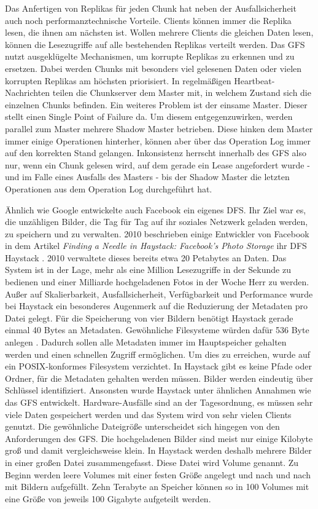 \documentclass[12pt,oneside,a4paper,parskip]{scrbook}
\begin{document}
Das Anfertigen von Replikas für jeden Chunk hat neben der Ausfallsicherheit auch noch performanztechnische Vorteile. Clients können immer die Replika lesen, die ihnen am nächsten ist. Wollen mehrere Clients die gleichen Daten lesen, können die Lesezugriffe auf alle bestehenden Replikas verteilt werden. Das GFS nutzt ausgeklügelte Mechanismen, um korrupte Replikas zu erkennen und zu ersetzen. Dabei werden Chunks mit besonders viel gelesenen Daten oder vielen korrupten Replikas am höchsten priorisiert. In regelmäßigen Heartbeat-Nachrichten teilen die Chunkserver dem Master mit, in welchem Zustand sich die einzelnen Chunks befinden. Ein weiteres Problem ist der einsame Master. Dieser stellt einen Single Point of Failure da. Um diesem entgegenzuwirken, werden parallel zum Master mehrere Shadow Master betrieben. Diese hinken dem Master immer einige Operationen hinterher, können aber über das Operation Log immer auf den korrekten Stand gelangen. Inkonsistenz herrscht innerhalb des GFS also nur, wenn ein Chunk gelesen wird, auf dem gerade ein Lease angefordert wurde - und im Falle eines Ausfalls des Masters - bis der Shadow Master die letzten Operationen aus dem Operation Log durchgeführt hat.

Ähnlich wie Google entwickelte auch Facebook ein eigenes DFS. Ihr Ziel war es, die unzähligen Bilder, die Tag für Tag auf ihr soziales Netzwerk geladen werden, zu speichern und zu verwalten. 2010 beschrieben einige Entwickler von Facebook in dem Artikel \textit{Finding a Needle in Haystack: Facebook's Photo Storage} ihr DFS Haystack \cite{haystack}. 2010 verwaltete dieses bereits etwa 20 Petabytes an Daten. Das System ist in der Lage, mehr als eine Million Lesezugriffe in der Sekunde zu bedienen und einer Milliarde hochgeladenen Fotos in der Woche Herr zu werden. Außer auf Skalierbarkeit, Ausfallsicherheit, Verfügbarkeit und Performance wurde bei Haystack ein besonderes Augenmerk auf die Reduzierung der Metadaten pro Datei gelegt. Für die Speicherung von vier Bildern benötigt Haystack gerade einmal 40 Bytes an Metadaten. Gewöhnliche Filesysteme würden dafür 536 Byte anlegen \cite{haystack}. Dadurch sollen alle Metadaten immer im Hauptspeicher gehalten werden und einen schnellen Zugriff ermöglichen. Um dies zu erreichen, wurde auf ein POSIX-konformes Filesystem verzichtet. In Haystack gibt es keine Pfade oder Ordner, für die Metadaten gehalten werden müssen. Bilder werden eindeutig über Schlüssel identifiziert. Ansonsten wurde Haystack unter ähnlichen Annahmen wie das GFS entwickelt. Hardware-Ausfälle sind an der Tagesordnung, es müssen sehr viele Daten gespeichert werden und das System wird von sehr vielen Clients genutzt. Die gewöhnliche Dateigröße unterscheidet sich hingegen von den Anforderungen des GFS. Die hochgeladenen Bilder sind meist nur einige Kilobyte groß und damit vergleichsweise klein. In Haystack werden deshalb mehrere Bilder in einer großen Datei zusammengefasst. Diese Datei wird Volume genannt. Zu Beginn werden leere Volumes mit einer festen Größe angelegt und nach und nach mit Bildern aufgefüllt. Zehn Terabyte an Speicher können so in 100 Volumes mit eine Größe von jeweils 100 Gigabyte aufgeteilt werden.
\end{document}
